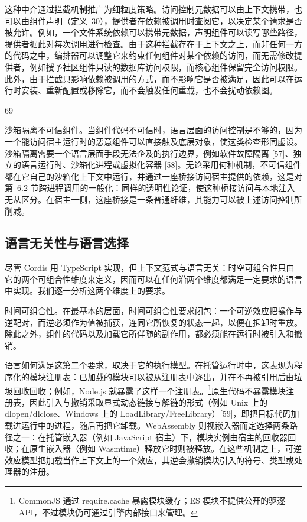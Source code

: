 \documentclass[
  10
]{article}
\begin{document}
这种中介通过拦截机制推广为细粒度策略。访问控制元数据可以由上下文携带，也可以由组件声明（定义~30），提供者在依赖被调用时查阅它，以决定某个请求是否被允许。例如，一个文件系统依赖可以携带元数据，声明组件可以读写哪些路径，提供者据此对每次调用进行检查。由于这种拦截存在于上下文之上，而非任何一方的代码之中，编排器可以调整它来约束任何组件对某个依赖的访问，而无需修改提供者，例如授予社区组件只读的数据库访问权限，而核心组件保留完全访问权限。此外，由于拦截只影响依赖被调用的方式，而不影响它是否被满足，因此可以在运行时安装、重新配置或移除它，而不会触发任何重载，也不会扰动依赖图。

69

沙箱隔离不可信组件。当组件代码不可信时，语言层面的访问控制是不够的，因为一个能访问宿主运行时的恶意组件可以直接触及底层对象，使这类检查形同虚设。沙箱隔离需要一个语言层面手段无法企及的执行边界，例如软件故障隔离 {[}57{]}、独立的语言运行时、沙箱化进程或虚拟化容器 {[}58{]}。无论采用何种机制，不可信组件都在它自己的沙箱化上下文中运行，并通过一座桥接访问宿主提供的依赖，这是对第~6.2 节跨进程调用的一般化：同样的透明性论证，使这种桥接访问与本地注入无从区分。在宿主一侧，这座桥接是一条普通纤维，其能力可以被上述访问控制所削减。

\subsection{语言无关性与语言选择} \label{language-independence-and-selection}

尽管 Cordis 用 TypeScript 实现，但上下文范式与语言无关：时空可组合性只由它的两个可组合性维度来定义，因而可以在任何沿两个维度都满足一定要求的语言中实现。我们逐一分析这两个维度上的要求。

时间可组合性。在最基本的层面，时间可组合性要求闭包：一个可逆效应把操作与逆配对，而逆必须作为值被捕获，连同它所恢复的状态一起，以便在拆卸时重放。除此之外，组件的代码以及加载它所伴随的副作用，都必须能在运行时被引入和撤销。

语言如何满足这第二个要求，取决于它的执行模型。在托管运行时中，这表现为程序化的模块注册表：已加载的模块可以被从注册表中逐出，并在不再被引用后由垃圾回收回收；例如，Node.js 就暴露了这样一个注册表。\footnote{CommonJS 通过 require.cache 暴露模块缓存；ES 模块不提供公开的驱逐 API，不过模块仍可通过引擎内部接口来管理。}原生代码不暴露模块注册表，因此引入与撤销采取显式动态链接与解链的形式（例如 Unix 上的 dlopen/dlclose、Windows 上的 LoadLibrary/FreeLibrary）{[}59{]}，即把目标代码加载进运行中的进程，随后再把它卸载。WebAssembly 则视嵌入器而定选择两条路径之一：在托管嵌入器（例如 JavaScript 宿主）下，模块实例由宿主的回收器回收；在原生嵌入器（例如 Wasmtime）释放它时则被释放。在这些机制之上，可逆效应模型把加载当作上下文上的一个效应，其逆会撤销模块引入的符号、类型或处理器的注册。
\end{document}
